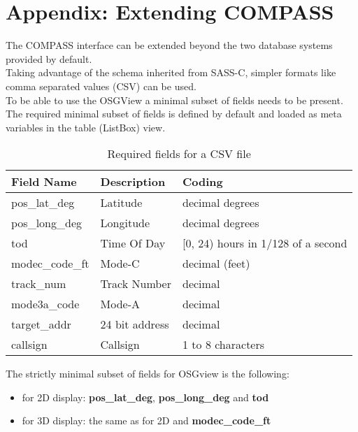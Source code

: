 
\section{Appendix: Extending COMPASS}
\label{sec:extending_compass}

The COMPASS interface can be extended beyond the two database systems provided by default. \\

Taking advantage of the schema inherited from SASS-C, simpler formats like comma separated values (CSV) can be used. \\

To be able to use the OSGView a minimal subset of fields needs to be present. The required minimal subset of fields is defined by default and loaded as meta variables in the table (ListBox) view. \\

\begin{table}[H]
  \center
  \begin{tabular}{ | l | l | l |}
    \hline
    \textbf{Field Name} & \textbf{Description} & \textbf{Coding} \\ \hline
    pos\_lat\_deg & Latitude & decimal degrees \\ \hline
    pos\_long\_deg & Longitude & decimal degrees \\ \hline
    tod & Time Of Day & [0, 24) hours in 1/128 of a second \\ \hline
    modec\_code\_ft & Mode-C & decimal (feet) \\ \hline
    track\_num & Track Number & decimal \\ \hline
    mode3a\_code & Mode-A & decimal \\ \hline
    target\_addr & 24 bit address & decimal \\ \hline
    callsign & Callsign & 1 to 8 characters \\ \hline
  \end{tabular}
  \caption{Required fields for a CSV file}
\end{table}

The strictly minimal subset of fields for OSGview is the following:
\begin{itemize}
\item for 2D display: \textbf{pos\_lat\_deg}, \textbf{pos\_long\_deg} and \textbf{tod}
\item for 3D display: the same as for 2D and \textbf{modec\_code\_ft}
\\
\end{itemize}

